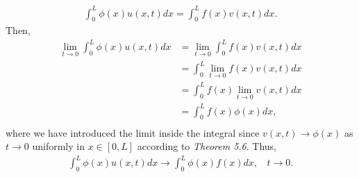 \begin{questions}
\begin{solution}
\begin{align*}
\int_0^L\phi(x)u(x,t)dx=\int_0^Lf(x)v(x,t)dx.
\end{align*}
Then,
\begin{align*}
\lim_{t\rightarrow 0}\int_0^L\phi(x)u(x,t)dx&=\lim_{t\rightarrow 0}\int_0^Lf(x)v(x,t)dx\\
&=\int_0^L\lim_{t\rightarrow 0}f(x)v(x,t)dx\\
&=\int_0^Lf(x)\lim_{t\rightarrow 0}v(x,t)dx\\
&=\int_0^Lf(x)\phi(x)dx,\\
\end{align*}
where we have introduced the limit inside the integral since $v(x,t)\rightarrow \phi(x)$ as $t\rightarrow 0$ uniformly in $x\in[0,L]$ according to \textsl{Theorem 5.6}. Thus,
\begin{align*}
\int_0^L\phi(x)u(x,t)dx\rightarrow\int_0^L\phi(x)f(x)dx,~~~~t\rightarrow 0.
\end{align*}
\end{solution}
\end{questions}
